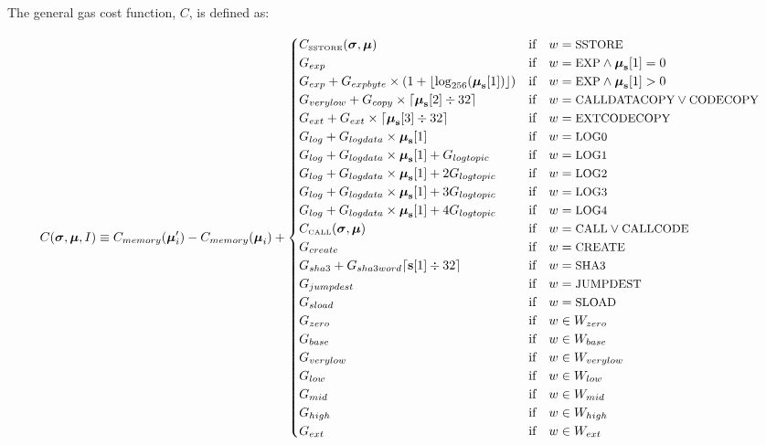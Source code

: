 \documentclass[9pt,oneside]{amsart}
\begin{document}
The general gas cost function, $C$, is defined as:

\begin{equation}
C(\boldsymbol{\sigma}, \boldsymbol{\mu}, I) \equiv C_{memory}(\boldsymbol{\mu}'_i)-C_{memory}(\boldsymbol{\mu}_i) + \begin{cases}
C_\text{\tiny SSTORE}(\boldsymbol{\sigma}, \boldsymbol{\mu}) & \text{if} \quad w = \text{\small SSTORE} \\
G_{exp} & \text{if} \quad w = \text{\small EXP} \wedge \boldsymbol{\mu}_\mathbf{s}[1] = 0 \\
G_{exp} + G_{expbyte}\times(1+\lfloor\log_{256}(\boldsymbol{\mu}_\mathbf{s}[1])\rfloor) & \text{if} \quad w = \text{\small EXP} \wedge \boldsymbol{\mu}_\mathbf{s}[1] > 0 \\
G_{verylow} + G_{copy}\times\lceil\boldsymbol{\mu}_\mathbf{s}[2] \div 32\rceil & \text{if} \quad w = \text{\small CALLDATACOPY} \lor \text{\small CODECOPY} \\
G_{ext} + G_{ext}\times\lceil\boldsymbol{\mu}_\mathbf{s}[3] \div 32\rceil & \text{if} \quad w = \text{\small EXTCODECOPY} \\
G_{log}+G_{logdata}\times\boldsymbol{\mu}_\mathbf{s}[1] & \text{if} \quad w = \text{\small LOG0} \\
G_{log}+G_{logdata}\times\boldsymbol{\mu}_\mathbf{s}[1]+G_{logtopic} & \text{if} \quad w = \text{\small LOG1} \\
G_{log}+G_{logdata}\times\boldsymbol{\mu}_\mathbf{s}[1]+2G_{logtopic} & \text{if} \quad w = \text{\small LOG2} \\
G_{log}+G_{logdata}\times\boldsymbol{\mu}_\mathbf{s}[1]+3G_{logtopic} & \text{if} \quad w = \text{\small LOG3} \\
G_{log}+G_{logdata}\times\boldsymbol{\mu}_\mathbf{s}[1]+4G_{logtopic} & \text{if} \quad w = \text{\small LOG4} \\
C_\text{\tiny CALL}(\boldsymbol{\sigma}, \boldsymbol{\mu}) & \text{if} \quad w = \text{\small CALL} \lor \text{\small CALLCODE} \\
G_{create} & \text{if} \quad w = \text{\small CREATE}\\
G_{sha3}+G_{sha3word} \lceil \mathbf{s}[1] \div 32 \rceil & \text{if} \quad w = \text{\small SHA3}\\
G_{jumpdest} & \text{if} \quad w = \text{\small JUMPDEST}\\
G_{sload} & \text{if} \quad w = \text{\small SLOAD}\\
G_{zero} & \text{if} \quad w \in W_{zero}\\
G_{base} & \text{if} \quad w \in W_{base}\\
G_{verylow} & \text{if} \quad w \in W_{verylow}\\
G_{low} & \text{if} \quad w \in W_{low}\\
G_{mid} & \text{if} \quad w \in W_{mid}\\
G_{high} & \text{if} \quad w \in W_{high}\\
G_{ext} & \text{if} \quad w \in W_{ext}
\end{cases}
\end{equation}
\end{document}

